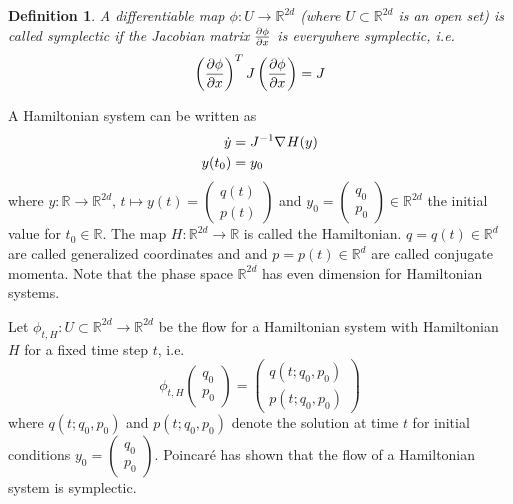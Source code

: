 \documentclass[twoside,a4paper]{article}
\newtheorem{definition}{Definition}
\begin{document}
\begin{definition}
	A differentiable map $\phi : U \to \mathbb{R}^{2d}$ (where $U \subset \mathbb{R}^{2d}$ is an open set)
	is called symplectic if the Jacobian matrix $\frac{\partial \phi}{\partial x}$ is everywhere symplectic, i.e.
	\begin{equation*}
		\left( \frac{\partial \phi}{\partial x} \right)^T J \left( \frac{\partial \phi}{\partial x} \right) = J
	\end{equation*}
\end{definition}

A Hamiltonian system can be written as
\begin{align*}
	\dot{y} &= J^{-1} \nabla_{}{H}(y) \\
	y(t_0) &= y_0
\end{align*}
where $y: \mathbb{R} \to \mathbb{R}^{2d},\, t \mapsto y(t) = \begin{pmatrix}
	q(t) \\
	p(t)
\end{pmatrix}$ and $y_0 = \begin{pmatrix}
	q_0 \\
	p_0
\end{pmatrix} \in \mathbb{R}^{2d}$ the initial value for $t_0 \in \mathbb{R}$. 
The map $H: \mathbb{R}^{2d} \to \mathbb{R}$ is called the Hamiltonian.
$q = q(t) \in \mathbb{R}^d$ are called generalized coordinates and
and $p=p(t) \in \mathbb{R}^d$ are called conjugate momenta. Note that the phase space $\mathbb{R}^{2d}$
has even dimension for Hamiltonian systems.

Let $\phi_{t,H} : U \subset \mathbb{R}^{2d} \to \mathbb{R}^{2d}$ be the flow for a Hamiltonian system 
with Hamiltonian $H$ for a fixed time step $t$, i.e.
\begin{equation*}
	\phi_{t,H}\begin{pmatrix}
		q_0 \\
		p_0
	\end{pmatrix}
	= \begin{pmatrix}
		q(t; q_0, p_0) \\
		p(t; q_0, p_0)
	\end{pmatrix}
\end{equation*}
where $q(t; q_0, p_0)$ and $p(t; q_0, p_0)$ denote the solution
at time $t$ for initial conditions $y_0 = \begin{pmatrix}
	q_0 \\
	p_0
\end{pmatrix}$. Poincaré has shown that the flow of a Hamiltonian system is symplectic.
\end{document}
